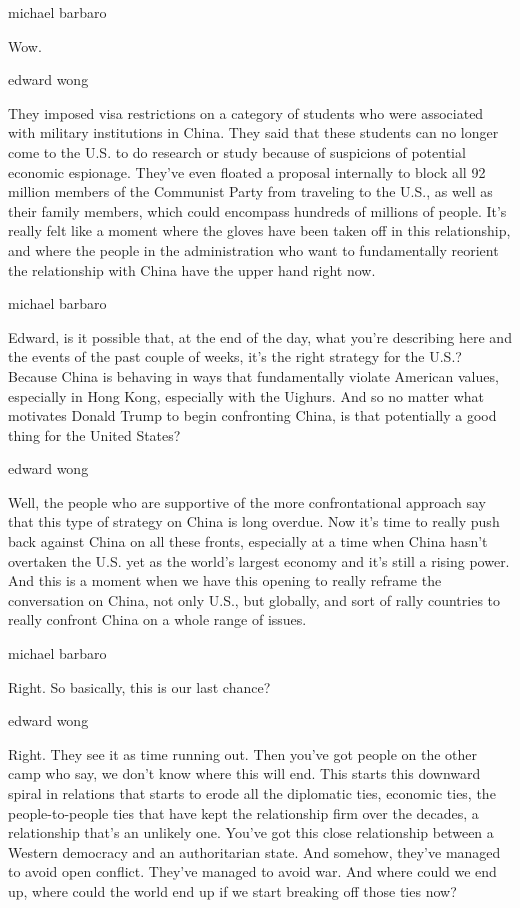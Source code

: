 michael barbaro

Wow.

edward wong

They imposed visa restrictions on a category of students who were
associated with military institutions in China. They said that these
students can no longer come to the U.S. to do research or study because
of suspicions of potential economic espionage. They've even floated a
proposal internally to block all 92 million members of the Communist
Party from traveling to the U.S., as well as their family members, which
could encompass hundreds of millions of people. It's really felt like a
moment where the gloves have been taken off in this relationship, and
where the people in the administration who want to fundamentally
reorient the relationship with China have the upper hand right now.

michael barbaro

Edward, is it possible that, at the end of the day, what you're
describing here and the events of the past couple of weeks, it's the
right strategy for the U.S.? Because China is behaving in ways that
fundamentally violate American values, especially in Hong Kong,
especially with the Uighurs. And so no matter what motivates Donald
Trump to begin confronting China, is that potentially a good thing for
the United States?

edward wong

Well, the people who are supportive of the more confrontational approach
say that this type of strategy on China is long overdue. Now it's time
to really push back against China on all these fronts, especially at a
time when China hasn't overtaken the U.S. yet as the world's largest
economy and it's still a rising power. And this is a moment when we have
this opening to really reframe the conversation on China, not only U.S.,
but globally, and sort of rally countries to really confront China on a
whole range of issues.

michael barbaro

Right. So basically, this is our last chance?

edward wong

Right. They see it as time running out. Then you've got people on the
other camp who say, we don't know where this will end. This starts this
downward spiral in relations that starts to erode all the diplomatic
ties, economic ties, the people-to-people ties that have kept the
relationship firm over the decades, a relationship that's an unlikely
one. You've got this close relationship between a Western democracy and
an authoritarian state. And somehow, they've managed to avoid open
conflict. They've managed to avoid war. And where could we end up, where
could the world end up if we start breaking off those ties now?

